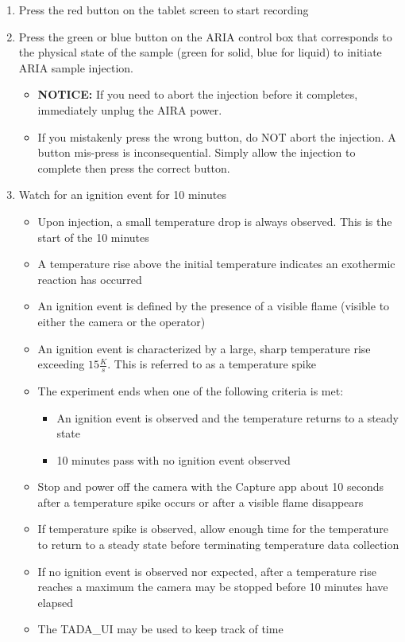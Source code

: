 \documentclass[letterpaper,11pt]{article}
\begin{document}
\begin{enumerate}
    \item Press the red button on the tablet screen to start recording
        
    \item Press the green or blue button on the ARIA control box that 
        corresponds to the physical state of the sample
        (green for solid, blue for liquid) to initiate ARIA sample injection.
        \begin{itemize}
        \item \textbf{NOTICE:} If you need to abort the injection before
            it completes, immediately unplug the AIRA power.
        \item If you mistakenly press the wrong button, do NOT abort the 
            injection. A button mis-press is inconsequential. Simply allow the 
            injection to complete then press the correct button.
        \end{itemize}
    
    \item Watch for an ignition event for 10 minutes
        \begin{itemize}
        \item Upon injection, a small temperature drop is always observed. This
            is the start of the 10 minutes
        \item A temperature rise above the initial temperature indicates an 
            exothermic reaction has occurred
        \item An ignition event is defined by the presence of a visible flame
            (visible to either the camera or the operator)
        \item An ignition event is characterized by a large, sharp temperature 
            rise exceeding $15 \frac{K}{s}$. This is referred to as
            a temperature spike
        \item The experiment ends when one of the following criteria is met:
            \begin{itemize} 
            \item An ignition event is observed and the temperature returns to 
                a steady state
            \item 10 minutes pass with no ignition event observed
            \end{itemize}
        \item Stop and power off the camera with the Capture app about 10 
            seconds after a temperature spike occurs or after a visible flame 
            disappears
        \item If temperature spike is observed, allow enough time for the
            temperature to return to a steady state before terminating 
            temperature data collection
		\item If no ignition event is observed nor expected, after a 
            temperature rise reaches a maximum the camera may be stopped 
            before 10 minutes have elapsed
        \item The TADA\_UI may be used to keep track of time
        \end{itemize}
    

\end{enumerate}
\end{document}
